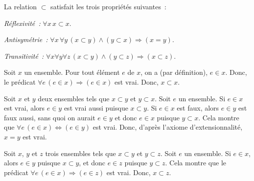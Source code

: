 \done

\blank[medium]

\noindent {} La relation $\subset$ satisfait les trois propriétés suivantes : 
\blank[samepage]
\startitemize[nowhite]
  \item \emph{Réflexivité :} $\forall x \, x \subset x$.
  \item \emph{Antisymétrie :} $\forall x \, \forall y \, (x \subset y) \wedge (y \subset x) \Rightarrow (x = y)$.
  \item \emph{Transitivité :} $\forall x \forall y \forall z \, (x \subset y) \wedge (y \subset z) \Rightarrow (x \subset z)$.
\stopitemize

\blank[medium]

\noindent {} 
\blank[samepage]
\startitemize[nowhite]
  \item Soit $x$ un ensemble. Pour tout élément $e$ de $x$, on a (par définition), $e \in x$. 
      Donc, le prédicat $\forall e \, (e \in x) \Rightarrow (e \in x)$ est vrai.
      Donc, $x \subset x$.
  \item Soit $x$ et $y$ deux ensembles tels que $x \subset y$ et $y \subset x$.
      Soit $e$ un ensemble. 
      Si $e \in x$ est vrai, alors $e \in y$ est vrai aussi puisque $x \subset y$.
      Si $e \in x$ est faux, alors $e \in y$ est faux aussi, sans quoi on aurait $e \in y$ et donc $e \in x$ puisque $y \subset x$.
      Cela montre que $\forall e \, (e \in x) \Leftrightarrow (e \in y)$ est vrai. 
      Donc, d'après l'axiome d'extensionnalité, $x = y$ est vrai.
  \item Soit $x$, $y$ et $z$ trois ensembles tels que $x \subset y$ et $y \subset z$. 
      Soit $e$ un ensemble. 
      Si $e \in x$, alors $e \in y$ puisque $x \subset y$, et donc $e \in z$ puisque $y \subset z$. 
      Cela montre que le prédicat $\forall e \, (e \in x) \Rightarrow (e \in z)$ est vrai.
      Donc, $x \subset z$.
\stopitemize

\done

\blank[medium]

